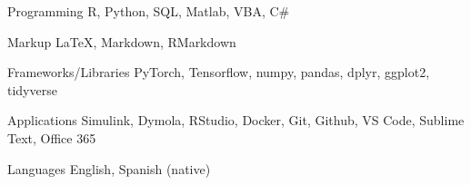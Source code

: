 

\begin{cvskills}

  \cvskill
    {Programming} %
    {R, Python, SQL, Matlab, VBA, C\#} %

\cvskill
{Markup}
{\LaTeX, Markdown, RMarkdown}

\cvskill
{Frameworks/Libraries}
{PyTorch, Tensorflow, numpy, pandas, dplyr, ggplot2, tidyverse}

\cvskill
  {Applications}
  {Simulink, Dymola, RStudio, Docker, Git, Github, VS Code, Sublime Text, Office 365}




  \cvskill
    {Languages} %
    {English, Spanish (native)} %

\end{cvskills}
